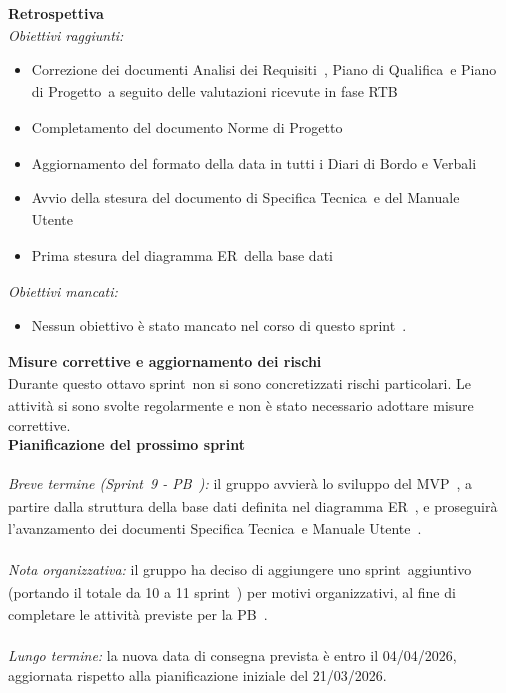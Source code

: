 \documentclass[a4paper,12pt]{article}
\newcommand{\pediceG}{\texorpdfstring{\textsubscript{\scalebox{0.6}{\textbf{G}}}~}{G}}
\begin{document}
\noindent\textbf{Retrospettiva\pediceG}\\
\textit{Obiettivi raggiunti:}
\begin{itemize}
    \item Correzione dei documenti Analisi dei Requisiti\pediceG, Piano di Qualifica\pediceG e Piano di Progetto\pediceG a seguito delle valutazioni ricevute in fase RTB\pediceG
    \item Completamento del documento Norme di Progetto\pediceG
    \item Aggiornamento del formato della data in tutti i Diari di Bordo e Verbali
    \item Avvio della stesura del documento di Specifica Tecnica\pediceG e del Manuale Utente\pediceG
    \item Prima stesura del diagramma ER\pediceG della base dati
\end{itemize}
\textit{Obiettivi mancati:}
\begin{itemize}
    \item Nessun obiettivo è stato mancato nel corso di questo sprint\pediceG.
\end{itemize}

\noindent\textbf{Misure correttive e aggiornamento dei rischi\pediceG}\\
Durante questo ottavo sprint\pediceG non si sono concretizzati rischi particolari. Le attività si sono svolte regolarmente e non è stato necessario adottare misure correttive.\\

\noindent\textbf{Pianificazione del prossimo sprint}\\\\
\textit{Breve termine (Sprint\pediceG 9 - PB\pediceG):} il gruppo avvierà lo sviluppo del MVP\pediceG, a partire dalla struttura della base dati definita nel diagramma ER\pediceG, e proseguirà l'avanzamento dei documenti Specifica Tecnica\pediceG e Manuale Utente\pediceG.\\\\
\textit{Nota organizzativa:} il gruppo ha deciso di aggiungere uno sprint\pediceG aggiuntivo (portando il totale da 10 a 11 sprint\pediceG) per motivi organizzativi, al fine di completare le attività previste per la PB\pediceG.\\\\
\textit{Lungo termine:} la nuova data di consegna prevista è entro il 04/04/2026, aggiornata rispetto alla pianificazione iniziale del 21/03/2026.\\
\end{document}
